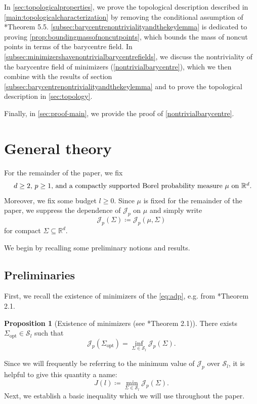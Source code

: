\documentclass[preprint, reqno]{amsart}
\theoremstyle{definition}
\newtheorem{proposition}[definition]{Proposition}
\numberwithin{equation}{section}
\begin{document}
In \cref{sec:topologicalproperties}, we prove the topological
description described in \cref{main:topologicalcharacterization} by
removing the conditional assumption of \cite{Stepanov06}*{Theorem
  5.5}. \cref{subsec:barycentrenontrivialityandthekeylemma} is
dedicated to proving \cref{prop:boundingmassofnoncutpoints}, which
bounds the mass of noncut points in terms of the barycentre field. In
\cref{subsec:minimizershavenontrivialbarycentrefields}, we discuss the
nontriviality of the barycentre field of minimizers
(\cref{nontrivialbarycentre}), which we then combine with the results
of section \cref{subsec:barycentrenontrivialityandthekeylemma} and
\cite{Stepanov06} to prove the topological description in
\cref{sec:topology}.

Finally, in \cref{sec:proof-main}, we provide the proof of
\cref{nontrivialbarycentre}.


\section{General theory}\label{sec:generaltheory}
For the remainder of the paper, we fix
\begin{align*}
  \hbox{ $d \geq 2$, $p \geq 1$, and a compactly supported Borel
  probability measure $\mu$ on $\mathbb{R}^d$.}
\end{align*}
Moreover, we fix some budget $l \geq 0$. Since $\mu$ is fixed for the
remainder of the paper, we suppress the dependence of $\mathscr{J}_p$
on $\mu$ and simply write
\[
  \mathscr{J}_p(\Sigma) \coloneqq \mathscr{J}_p(\mu, \Sigma)
\]
for compact $\Sigma \subseteq \mathbb{R}^d$.

We begin by recalling some preliminary notions and results.
\subsection{Preliminaries}\label{subsec:preliminaries}

First, we recall the existence of minimizers of the \eqref{eq:adp},
e.g. from \cite{Buttazzo02}*{Theorem 2.1}.

\begin{proposition}[Existence of minimizers (see
  \cite{Buttazzo02}*{Theorem 2.1})]\label{prop:existence}
  There exists $\Sigma_{\mathrm{opt}} \in \mathcal{S}_l$ such that
  \[
    \mathscr{J}_p(\Sigma_{\mathrm{opt}}) = \inf_{\Sigma \in
      \mathcal{S}_l}\mathscr{J}_p(\Sigma).
  \]
\end{proposition}

Since we will frequently be referring to the minimum value of
$\mathscr{J}_p$ over $\mathcal{S}_l$, it is helpful to give this
quantity a name:
\begin{equation}\label{eq:jdefinition}
  J(l)\coloneqq \min_{\Sigma \in \mathcal{S}_l}\mathscr{J}_p(\Sigma).
\end{equation}
Next, we establish a basic inequality which we will use throughout the
paper.
\end{document}

